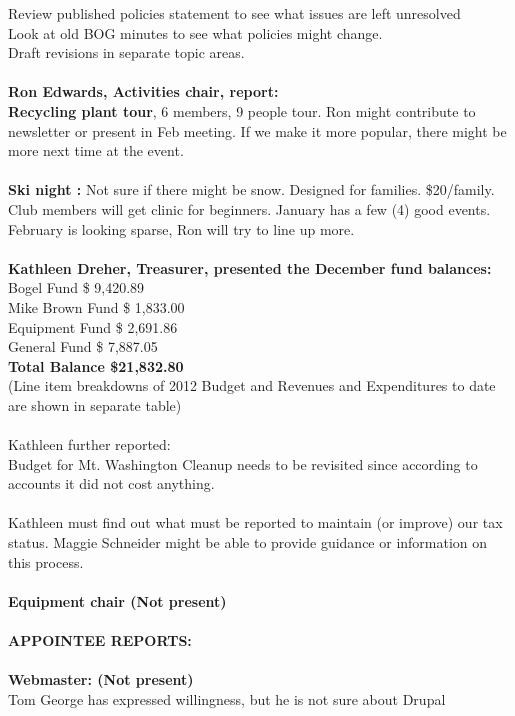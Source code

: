 \documentclass[10pt,a4paper]{article}
\begin{document}
\begin{multicols}{2}
	Review published policies statement to see what issues are left unresolved \\
	Look at old BOG minutes to see what policies might change. \\
	Draft revisions in separate topic areas. 
\\
\\	
\textbf{Ron Edwards, Activities chair, report:} \\
\textbf{Recycling plant tour}, 6 members, 9 people tour. Ron might contribute to newsletter or present in Feb meeting. If we make it more popular, there might be more next time at the event.
\\
\\
\textbf{Ski night :}  Not sure if there might be snow. Designed for families. \$20/family. Club members will get clinic for beginners.
January has a few (4) good events. February is looking sparse, Ron will try to line up more.
\\
\\
\textbf{Kathleen Dreher, Treasurer, presented the December fund balances:} \\
	Bogel Fund		\$  9,420.89 \\
	Mike Brown Fund	\$  1,833.00 \\ 
	Equipment Fund	\$  2,691.86 \\
	General Fund		\$  7,887.05 \\
\textbf{	   Total Balance	 \$21,832.80} \\
   (Line item breakdowns of 2012 Budget and Revenues and Expenditures to date are shown in separate table)
\\
\\
Kathleen further reported: \\
   Budget for Mt. Washington Cleanup needs to be revisited since according to accounts it did not cost anything.
   \\
   \\
Kathleen must find out what must be reported to maintain (or improve) our tax status. Maggie Schneider might be able to provide guidance or information on this process.
\\
\\
\textbf{Equipment chair (Not present)}
\\
\\
\textbf{APPOINTEE REPORTS: }\\
\\
\textbf{Webmaster: (Not present)} \\
   Tom George has expressed willingness, but he is not sure about Drupal

\end{multicols}
\end{document}
